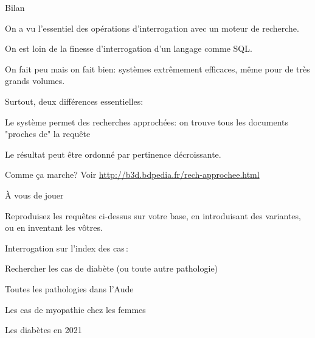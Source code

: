 \begin{frame}[fragile]{Bilan}


On a vu l'essentiel des opérations d'interrogation avec un moteur
de recherche.

  \begin{redbullet}
    \item On est loin de la finesse d'interrogation d'un langage comme SQL.
    
    \item On fait peu mais on fait bien: systèmes extrêmement efficaces, même pour
        de très grands volumes. 
  \end{redbullet}

\vfill

\alert{Surtout}, deux différences essentielles:

 \begin{redbullet}
    \item Le système permet des recherches \alert{approchées}: on trouve tous les documents "proches de" la requête
    \item Le résultat peut être \alert{ordonné} par pertinence décroissante.
  \end{redbullet}

\vfill

Comme ça marche? Voir \url{http://b3d.bdpedia.fr/rech-approchee.html}
\end{frame}



\begin{frame}[fragile]{À vous de jouer}

Reproduisez les requêtes ci-dessus sur votre base, en  
introduisant des variantes, ou en inventant les vôtres.

\vfill

Interrogation sur l'index des cas\,:

  \begin{redbullet}
    \item Rechercher les cas de diabète (ou toute autre pathologie)
    \item Toutes les pathologies dans l'Aude
    \item Les cas de myopathie chez les femmes
    \item Les diabètes en 2021 
  \end{redbullet}
\end{frame}

